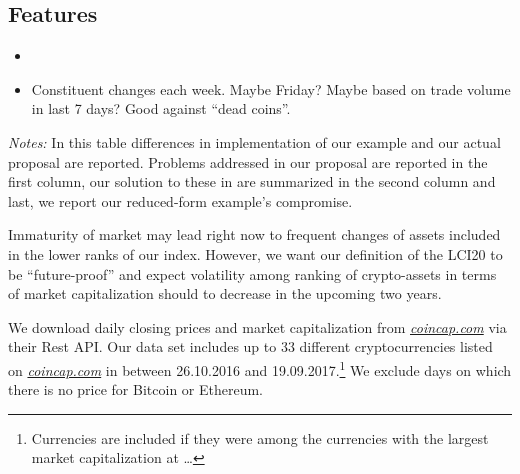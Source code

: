 \documentclass[11pt]{article}
\newcommand\fnotes[1]{\captionsetup{font=scriptsize}\caption*{\textsl{Notes:} #1}}
\begin{document}
\subsection{Features}

\begin{itemize}
  \item
  \item Constituent changes each week. Maybe Friday? Maybe based on trade volume in last 7 days? Good against ``dead coins''.
\end{itemize}

\begin{table}
\caption{Proposal vs.\ example}
\centering
{}
\fnotes{In this table differences in implementation of our example and our actual proposal are reported. Problems addressed in our proposal are reported in the first column, our solution to these in are summarized in the second column and last, we report our reduced-form example's compromise.}
\end{table}





Immaturity of market may lead right now to frequent changes of assets included in the lower ranks of our index.
However, we want our definition of the LCI20 to be ``future-proof'' and expect volatility among ranking of crypto-assets in terms of market capitalization should to decrease in the upcoming two years.

We download daily closing prices and market capitalization from \href{https://coincap.com}{\textit{coincap.com}} via their Rest API.
Our data set includes up to 33 different cryptocurrencies listed on \href{https://coincap.com}{\textit{coincap.com}} in between 26.10.2016 and 19.09.2017.\footnote{Currencies are included if they were among the currencies with the largest market capitalization at \dots}
We exclude days on which there is no price for Bitcoin or Ethereum.











\end{document}

